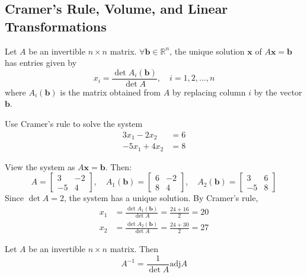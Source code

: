 \documentclass[11pt]{scrartcl}
\theoremstyle{dotlessP}
\theoremstyle{dotlessN}
\newcommand{\reals}{\mathbb{R}} %
\newcommand{\adj}{\text{adj}}
\begin{document}
\subsection{Cramer's Rule, Volume, and Linear Transformations}
\begin{theorem}
	Let $A$ be an invertible $n \times n$ matrix. $\forall \bm{b} \in \reals^n$, the unique solution $\bm{x}$ of $A\bm{x} = \bm{b}$ has entries given by
	\[
	x_i = 
	\frac{\det A_i(\bm{b})}{\det A}, \quad i = 1,2,\dots, n
	\] 
	where $A_i(\bm{b})$ is the matrix obtained from $A$ by replacing column $i$ by the vector $\bm{b}$.
\end{theorem}
\begin{example}
	Use Cramer's rule to solve the system
	\begin{align*}
		3x_1 - 2x_2 &= 6 \\
		-5x_1 + 4x_2 &= 8
	\end{align*}
\end{example}
\begin{soln}
	View the system as $A\bm{x} = \bm{b}$. Then:
	\[
	A = 
	\begin{bmatrix}
		3 & -2 \\
		-5 & 4
	\end{bmatrix}, \quad 
	A_1(\bm{b}) = 
	\begin{bmatrix}
		6 & -2 \\
		8 & 4
	\end{bmatrix}, \quad
	A_2(\bm{b}) =
	\begin{bmatrix}
		3 & 6 \\
		-5 & 8
	\end{bmatrix}
	\]
	Since $\det A = 2$, the system has a unique solution. By Cramer's rule,
	\begin{align*}
		x_1 &=
		\frac{\det A_1(\bm{b})}{\det A} = \frac{24 + 16}{2} = 20 \\
		x_2 &=
		\frac{\det A_2(\bm{b})}{\det A} = \frac{24 + 30}{2} = 27
	\end{align*}
\end{soln}
\begin{theorem}
	Let $A$ be an invertible $n \times n$ matrix. Then
	\[
		A^{-1} = \frac{1}{\det A}\adj A
	\] 
\end{theorem}
\end{document}
